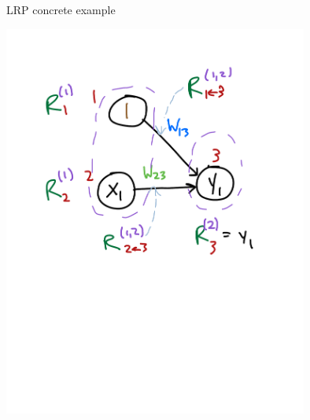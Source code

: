 \documentclass[compress]{beamer}
\begin{document}
\begin{frame}{LRP concrete example}
  \begin{center}
    \includegraphics[width=0.75\textwidth]{./figures/lr_nn_6.pdf}
  \end{center}
\end{frame}

\end{document}
